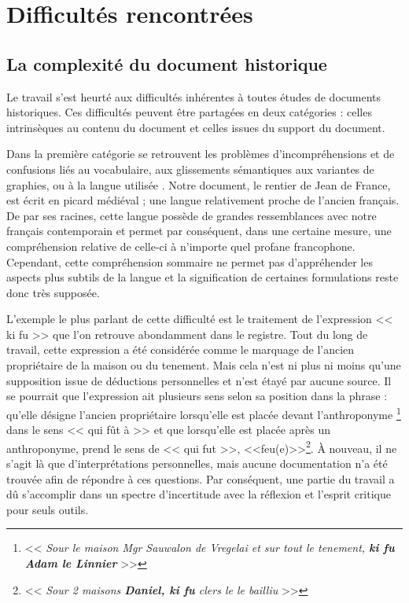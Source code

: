 \section{Difficultés rencontrées}

\subsection{La complexité du document historique}
Le travail s'est heurté aux difficultés inhérentes à toutes études de documents historiques. Ces difficultés peuvent  être partagées en deux catégories : celles intrinsèques au contenu du document et celles issues du support du document. 

Dans la première catégorie se retrouvent les problèmes d'incompréhensions et de confusions liés au vocabulaire, aux glissements sémantiques aux variantes de graphies, ou à la langue utilisée \parencite{piotrowski_natural_2012}.
Notre document, le rentier de Jean de France, est écrit en picard médiéval ; une langue relativement proche de l'ancien français. De par ses racines, cette langue possède de grandes ressemblances avec notre français contemporain et permet par conséquent, dans une certaine mesure, une compréhension relative de celle-ci à n'importe quel profane francophone.
Cependant, cette compréhension sommaire ne permet pas d'appréhender les aspects plus subtils de la langue et la signification de certaines formulations reste donc très supposée. 

L'exemple le plus parlant de cette difficulté est le traitement de l'expression << ki fu >> que l'on retrouve abondamment dans le registre. Tout du long de travail, cette expression a été considérée comme le marquage de l'ancien propriétaire de la maison ou du tenement. Mais cela n'est ni plus ni moins qu'une supposition issue de déductions personnelles et n'est étayé par aucune source. Il se pourrait que l'expression ait plusieurs sens selon sa position dans la phrase : qu'elle désigne l'ancien propriétaire lorsqu'elle est placée devant l'anthroponyme \footnote{ << \textit{Sour le  maison Mgr Sauwalon de Vregelai et sur tout le tenement, \textbf{ki fu Adam le Linnier}} >>} dans le sens << qui fût à >> et que lorsqu'elle est placée après  un anthroponyme, prend le sens de  << qui fut >>, <<feu(e)>>\footnote{ << \textit{Sour 2 maisons \textbf{Daniel, ki fu} clers le le bailliu} >> }. À nouveau, il ne s'agit là que d'interprétations personnelles, mais aucune documentation n'a été trouvée afin de répondre à ces questions. Par conséquent, une partie du travail a dû s'accomplir dans un spectre d'incertitude avec la réflexion et l'esprit critique pour seuls outils.

